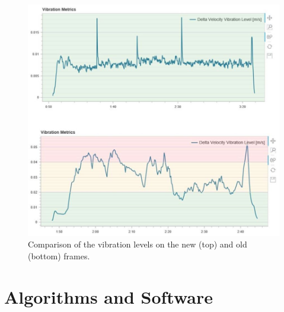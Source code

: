 \documentclass{article}
\begin{document}
\begin{figure}[thpb]
\centering
\includegraphics[scale=0.7]{Pics/Vib_Comp.jpg}
\caption{Comparison of the vibration levels on the new (top) and old (bottom) frames.}
\label{Fig_Vib_Res}
\end{figure}


\section{Algorithms and Software}
\end{document}
